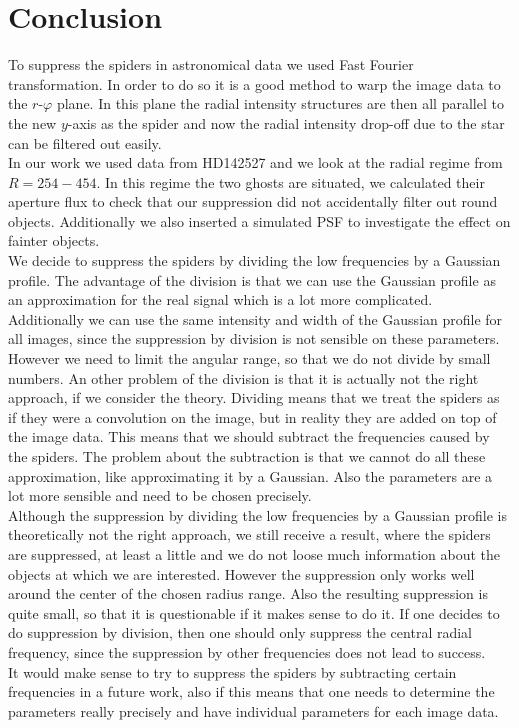 \section{Conclusion}
\label{sec:conclusion}
To suppress the spiders in astronomical data we used Fast Fourier transformation. In order to do so it is a good method to warp the image data to the $r$-$\varphi$ plane. In this plane the radial intensity structures are then all parallel to the new $y$-axis as the spider and now the radial intensity drop-off due to the star can be filtered out easily.\\
In our work we used data from HD142527 and we look at the radial regime from $R=254-454$. In this regime the two ghosts are situated, we calculated their aperture flux to check that our suppression did not accidentally filter out round objects. Additionally we also inserted a simulated PSF to investigate the effect on fainter objects. \\
We decide to suppress the spiders by dividing the low frequencies by a Gaussian profile. The advantage of the division is that we can use the Gaussian profile as an approximation for the real signal which is a lot more complicated. Additionally we can use the same intensity and width of the Gaussian profile for all images, since the suppression by division is not sensible on these parameters. However we need to limit the angular range, so that we do not divide by small numbers. An other problem of the division is that it is actually not the right approach, if we consider the theory. Dividing means that we treat the spiders as if they were a convolution on the image, but in reality they are added on top of the image data. This means that we should subtract the frequencies caused by the spiders. The problem about the subtraction is that we cannot do all these approximation, like approximating it by a Gaussian. Also the parameters are a lot more sensible and need to be chosen precisely. \\
Although the suppression by dividing the low frequencies by a Gaussian profile is theoretically not the right approach, we still receive a result, where the spiders are suppressed, at least a little and we do not loose much information about the objects at which we are interested. However the suppression only works well around the center of the chosen radius range. Also the resulting suppression is quite small, so that it is questionable if it makes sense to do it. If one decides to do suppression by division, then one should only suppress the central radial frequency, since the suppression by other frequencies does not lead to success.\\ 
It would make sense to try to suppress the spiders by subtracting certain frequencies in a future work, also if this means that one needs to determine the parameters really precisely and have individual parameters for each image data. 
 